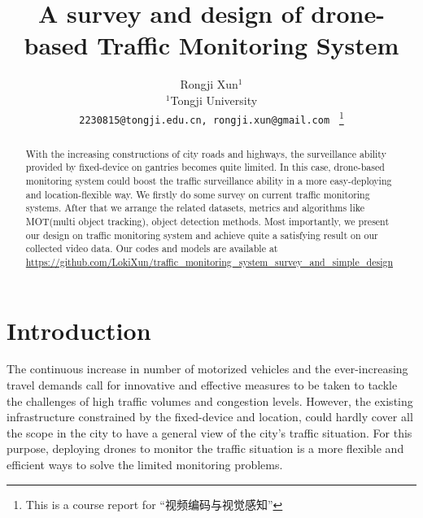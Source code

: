 \documentclass[10pt,twocolumn,letterpaper]{article}  %
\begin{document}

\date{}
\title{A survey and design of drone-based Traffic Monitoring System}

\author{Rongji Xun$^{1}$\\
	$^{1}$Tongji University\\
	{\tt\small 2230815@tongji.edu.cn, rongji.xun@gmail.com }
	\thanks{This is a course report for ``视频编码与视觉感知''}
}


\maketitle

\begin{abstract}
	With the increasing constructions of city roads and highways, the surveillance ability provided by fixed-device on gantries becomes quite limited. In this case, drone-based monitoring system could boost the traffic surveillance ability in a more easy-deploying and location-flexible way. We firstly do some survey on current traffic monitoring systems. After that we arrange the related datasets, metrics and algorithms like MOT(multi object tracking), object detection methods. Most importantly, we present our design on traffic monitoring system and achieve quite a satisfying result on our collected video data. Our codes and models are available at \url{https://github.com/LokiXun/traffic_monitoring_system_survey_and_simple_design}
\end{abstract}


\section{Introduction}
The continuous increase in number of motorized vehicles and the ever-increasing travel demands call for innovative and effective measures to be taken to tackle the challenges of high traffic volumes and congestion levels.\cite{khan2017uav} However, the existing infrastructure constrained by the fixed-device and location, could hardly cover all the scope in the city to have a general view of the city's traffic situation. For this purpose, deploying drones to monitor the traffic situation is a more flexible and efficient ways to solve the limited monitoring problems.
\end{document}
